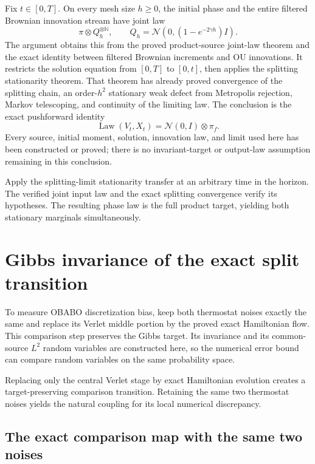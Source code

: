 \documentclass[11pt,a4paper]{report}
\begin{document}
Fix \(t\in[0,T]\). On every mesh size \(h\ge0\), the initial phase and the entire filtered Brownian innovation stream have joint law \[\pi\otimes Q_h^{\otimes\mathbb N},\qquad Q_h=\mathcal N\!\left(0,(1-e^{-2\gamma h})I\right).\] The argument obtains this from the proved product-source joint-law theorem and the exact identity between filtered Brownian increments and OU innovations. It restricts the solution equation from \([0,T]\) to \([0,t]\), then applies the splitting stationarity theorem. That theorem has already proved convergence of the splitting chain, an order-\(h^2\) stationary weak defect from Metropolis rejection, Markov telescoping, and continuity of the limiting law. The conclusion is the exact pushforward identity \[\operatorname{Law}(V_t,X_t)=\mathcal N(0,I)\otimes\pi_f.\] Every source, initial moment, solution, innovation law, and limit used here has been constructed or proved; there is no invariant-target or output-law assumption remaining in this conclusion.



Apply the splitting-limit stationarity transfer at an arbitrary time in the horizon. The verified joint input law and the exact splitting convergence verify its hypotheses. The resulting phase law is the full product target, yielding both stationary marginals simultaneously.

\section{\texorpdfstring{Gibbs invariance of the exact split transition}{Gibbs invariance of the exact split transition}}
\label{proof-module-KineticLangevin-ExactOBABO-lean}


To measure OBABO discretization bias, keep both thermostat noises exactly the same and replace its Verlet middle portion by the proved exact Hamiltonian flow. This comparison step preserves the Gibbs target. Its invariance and its common-source \(L^{2}\) random variables are constructed here, so the numerical error bound can compare random variables on the same probability space.



Replacing only the central Verlet stage by exact Hamiltonian evolution creates a target-preserving comparison transition. Retaining the same two thermostat noises yields the natural coupling for its local numerical discrepancy.

\subsection{\texorpdfstring{The exact comparison map with the same two noises}{The exact comparison map with the same two noises}}
\label{report-step-KineticLangevin-ExactOBABO-lean-1}
\end{document}
